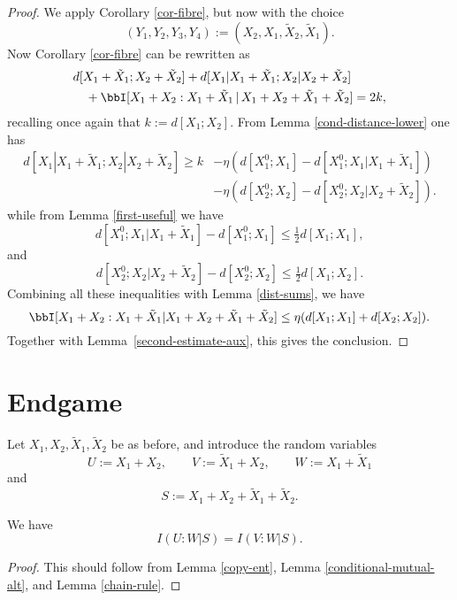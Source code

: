 \begin{proof}
  \leanok
  We apply Corollary \ref{cor-fibre}, but now with the choice
  \[
    (Y_1,Y_2,Y_3,Y_4) := (X_2, X_1, \tilde X_2, \tilde X_1).
  \]
  Now Corollary \ref{cor-fibre} can be rewritten as
  \begin{align*}
    &d[X_1+\tilde X_1;X_2+\tilde X_2] + d[X_1|X_1+\tilde X_1; X_2|X_2+\tilde X_2] \\
    &\quad + \bbI[X_1+X_2 : X_1 + \tilde X_1 \,|\, X_1+X_2+\tilde X_1+\tilde X_2] = 2k,
  \end{align*}
  recalling once again that $k := d[X_1;X_2]$.  From Lemma \ref{cond-distance-lower} one has
  \begin{align*}
    d[X_1|X_1+\tilde X_1; X_2|X_2+\tilde X_2]   \geq k &- \eta (d[X^0_1;X_1] - d[X^0_1;X_1|X_1+\tilde X_1]) \\& - \eta (d[X^0_2;X_2] - d[X^0_2;X_2|X_2+\tilde X_2]) .
  \end{align*}
  while from Lemma \ref{first-useful} we have
  \[
    d[X^0_1;X_1|X_1+\tilde X_1] -  d[X^0_1;X_1] \leq  \tfrac{1}{2} d[X_1;X_1],
  \]
  and
  \[
    d[X^0_2;X_2|X_2+\tilde X_2] -  d[X^0_2;X_2] \leq \tfrac{1}{2} d[X_1;X_2].
    \]
  Combining all these inequalities with Lemma \ref{dist-sums}, we have
  \begin{equation}\label{combined}
  \bbI[X_1+X_2 : X_1 + \tilde X_1 | X_1+X_2+\tilde X_1+\tilde X_2] \leq \eta ( d[X_1; X_1] + d[X_2; X_2] ).
  \end{equation}
  Together with Lemma~\ref{second-estimate-aux}, this gives the conclusion.
\end{proof}


\section{Endgame}

Let $X_1,X_2,\tilde X_1,\tilde X_2$ be as before, and introduce the random variables
\[U := X_1 + X_2, \qquad V := \tilde X_1 + X_2, \qquad W := X_1 + \tilde X_1\] and
\[  S := X_1 + X_2 + \tilde X_1 + \tilde X_2.\]

\begin{lemma}\label{symm-lemma}
  \leanok
We have
$$ I(U:W | S) = I(V:W | S).$$
\end{lemma}

\begin{proof}\leanok
This should follow from Lemma \ref{copy-ent}, Lemma \ref{conditional-mutual-alt}, and Lemma \ref{chain-rule}.
\end{proof}

